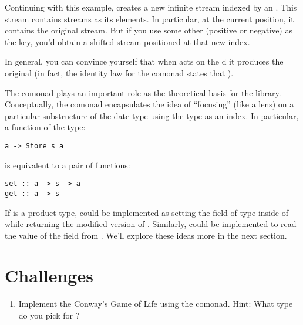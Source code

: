 Continuing with this example,  creates a new infinite
stream indexed by an . This stream contains streams as its
elements. In particular, at the current position, it contains the
original stream. But if you use some other  (positive or
negative) as the key, you'd obtain a shifted stream positioned at that
new index.

In general, you can convince yourself that when  acts on
the d  it produces the original
 (in fact, the identity law for the comonad states that
).

The  comonad plays an important role as the theoretical
basis for the  library. Conceptually, the
 comonad encapsulates the idea of ``focusing'' (like
a lens) on a particular substructure of the date type  using
the type  as an index. In particular, a function of the type:

\begin{verbatim}
a -> Store s a
\end{verbatim}
is equivalent to a pair of functions:

\begin{verbatim}
set :: a -> s -> a
get :: a -> s
\end{verbatim}
If  is a product type,  could be implemented as
setting the field of type  inside of  while
returning the modified version of . Similarly, 
could be implemented to read the value of the  field from
. We'll explore these ideas more in the next section.

\section{Challenges}\label{challenges}

\begin{enumerate}
\tightlist
\item
  Implement the Conway's Game of Life using the  comonad.
  Hint: What type do you pick for ?
\end{enumerate}
